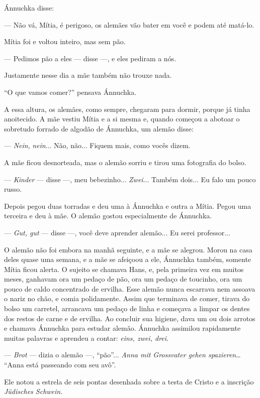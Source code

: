 Ánnuchka disse:

--- Não vá, Mítia, é perigoso, os alemães vão bater em você e podem até
matá-lo.

Mítia foi e voltou inteiro, mas sem pão.

--- Pedimos pão a eles --- disse ---, e eles pediram a nós.

Justamente nesse dia a mãe também não trouxe nada.

``O que vamos comer?'' pensava Ánnuchka.

A essa altura, os alemães, como sempre, chegaram para dormir, porque já
tinha anoitecido. A mãe vestiu Mítia e a si mesma e, quando começou a
abotoar o sobretudo forrado de algodão de Ánnuchka, um alemão disse:

--- \emph{Nein}, \emph{nein}... Não, não... Fiquem mais, como vocês
dizem.

A mãe ficou desnorteada, mas o alemão sorriu e tirou uma fotografia do
bolso.

--- \emph{Kinder} --- disse ---, meu bebezinho... \emph{Zwei}... Também
dois... Eu falo um pouco russo.

Depois pegou duas torradas e deu uma à Ánnuchka e outra a Mítia. Pegou
uma terceira e deu à mãe. O alemão gostou especialmente de Ánnuchka.

--- \emph{Gut, gut} --- disse ---, você deve aprender alemão... Eu serei
professor...

O alemão não foi embora na manhã seguinte, e a mãe se alegrou. Morou na
casa deles quase uma semana, e a mãe se afeiçoou a ele, Ánnuchka também,
somente Mítia ficou alerta. O sujeito se chamava Hans, e, pela primeira
vez em muitos meses, ganhavam ora um pedaço de pão, ora um pedaço de
toucinho, ora um pouco de caldo concentrado de ervilha. Esse alemão
nunca escarrava nem assoava o nariz no chão, e comia polidamente. Assim
que terminava de comer, tirava do bolso um carretel, arrancava um pedaço
de linha e começava a limpar os dentes dos restos de carne e de ervilha.
Ao concluir sua higiene, dava um ou dois arrotos e chamava Ánnuchka para
estudar alemão. Ánnuchka assimilou rapidamente muitas palavras e
aprendeu a contar: \emph{eins, zwei, drei}.

--- \emph{Brot} --- dizia o alemão ---, ``pão''... \emph{Anna mit
Grossvater gehen spazieren}\ldots{} ``Anna está passeando com seu avô''.

Ele notou a estrela de seis pontas desenhada sobre a testa de Cristo e a
inscrição \emph{Jüdisches Schwein}.

